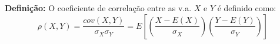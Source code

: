 \documentclass[14pt,aspectratio=1610]{beamer}
\begin{document}
\begin{frame}{}
\frametitle{}
\begin{block}{}
\justifying
\textbf{Definição:} O coeficiente de correlação entre as v.a. $X$ e $Y$ é definido como: 
$$\rho(X,Y)=\dfrac{cov(X,Y)}{\sigma_{X}\sigma_{Y}}=E\left[\left(\dfrac{X-E(X)}{\sigma_{X}}\right)\left(\dfrac{Y-E(Y)}{\sigma_{Y}}\right)\right]$$
\end{block}
\end{frame}

% 
% 
% 
% 
% 
% 
% 
% 
% 
% 
% 
% 
% 
% 
% 
% 
% 
% 
% 
% 
% 
% 
% 
% 
\end{document}
